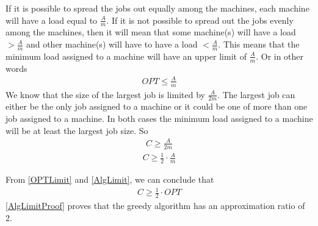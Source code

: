 \documentclass[paper=a4, fontsize=11pt]{scrartcl} %
\numberwithin{figure}{section} %
\numberwithin{table}{section} %
\begin{document}
\begin{enumerate}
\begin{enumerate}
If it is possible to spread the jobs out equally among the machines, each machine will have a load equal to $\frac{A}{m}$. If it is not possible to spread out the jobs evenly among the machines, then it will mean that some machine(s) will have a load $> \frac{A}{m}$ and other machine(s) will have to have a load $< \frac{A}{m}$. This means that the minimum load assigned to a machine will have an upper limit of $\frac{A}{m}$. Or in other words
\begin{align} \label{OPTLimit}
OPT \leq \frac{A}{m}
\end{align}
We know that the size of the largest job is limited by $\frac{A}{2m}$. The largest job can either be the only job assigned to a machine or it could be one of more than one job assigned to a machine. In both cases the minimum load assigned to a machine will be at least the largest job size. So
\begin{align*}
C \geq \frac{A}{2m}
\end{align*}
\begin{align} \label{AlgLimit}
C \geq \frac{1}{2} \cdot \frac{A}{m}
\end{align}

From \ref{OPTLimit} and \ref{AlgLimit}, we can conclude that
\begin{align} \label{AlgLimitProof}
C \geq \frac{1}{2} \cdot OPT
\end{align}
\ref{AlgLimitProof} proves that the greedy algorithm has an approximation ratio of 2.

\end{enumerate}

\end{enumerate}

\end{document}
